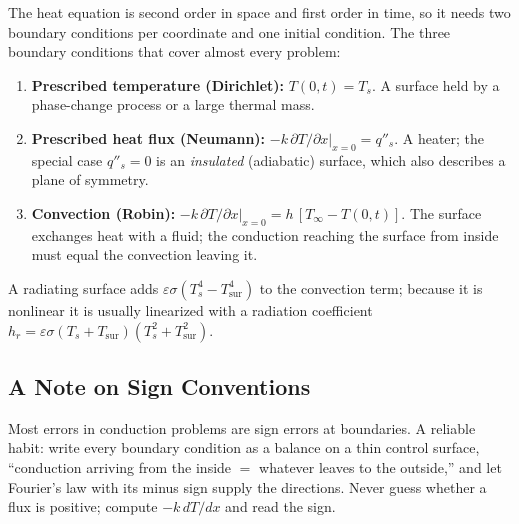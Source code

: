 The heat equation is second order in space and first order in time, so it needs two boundary conditions per coordinate and one initial condition. The three boundary conditions that cover almost every problem:
\begin{enumerate}
    \item \textbf{Prescribed temperature (Dirichlet):} $T(0,t) = T_s$. A surface held by a phase-change process or a large thermal mass.
    \item \textbf{Prescribed heat flux (Neumann):} $-k\,\partial T/\partial x|_{x=0} = q''_s$. A heater; the special case $q''_s = 0$ is an \emph{insulated} (adiabatic) surface, which also describes a plane of symmetry.
    \item \textbf{Convection (Robin):} $-k\,\partial T/\partial x|_{x=0} = h\,[T_\infty - T(0,t)]$. The surface exchanges heat with a fluid; the conduction reaching the surface from inside must equal the convection leaving it.
\end{enumerate}
A radiating surface adds $\varepsilon\sigma(T_s^4 - T_{\text{sur}}^4)$ to the convection term; because it is nonlinear it is usually linearized with a radiation coefficient $h_r = \varepsilon\sigma(T_s + T_{\text{sur}})(T_s^2 + T_{\text{sur}}^2)$.

\subsection*{A Note on Sign Conventions}

Most errors in conduction problems are sign errors at boundaries. A reliable habit: write every boundary condition as a balance on a thin control surface, ``conduction arriving from the inside $=$ whatever leaves to the outside,'' and let Fourier's law with its minus sign supply the directions. Never guess whether a flux is positive; compute $-k\,dT/dx$ and read the sign.
